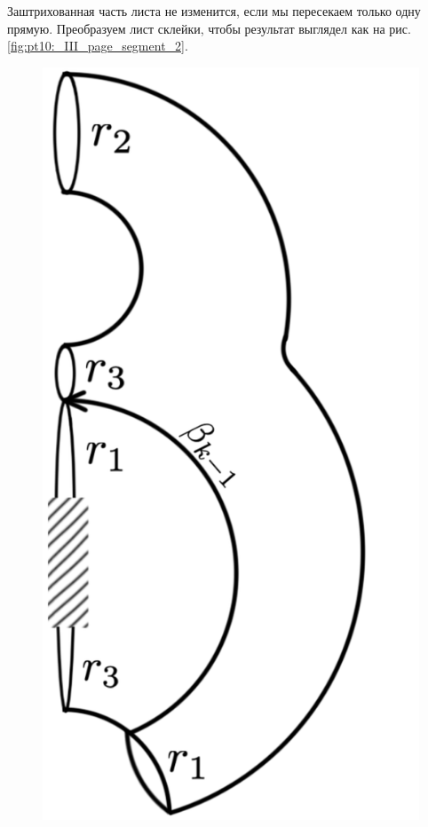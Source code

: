 Заштрихованная часть листа не изменится, если мы пересекаем только одну прямую. Преобразуем лист склейки, чтобы результат выглядел как на рис. \ref{fig:pt10:_III_page_segment_2}.

\begin{figure}[!htb]
\centering
\includegraphics[scale=0.11]{images/section3_circular/atoms/III/surface_half.pdf}

\end{figure}
